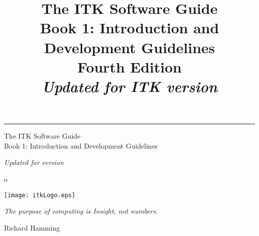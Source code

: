 \documentclass{InsightSoftwareGuide}
\title{The ITK Software Guide\\Book 1: Introduction and Development Guidelines\\Fourth Edition\\ \emph{Updated for ITK version
\ITKVERSIONMAJORMINOR}}
\begin{document}
\ifitkPrintedVersion

  \begin{minipage}[t][3cm][b]{\textwidth}
  \rule{14cm}{1pt}
  \end{minipage}

  \begin{minipage}[t][3cm][b]{\textwidth}
  \Huge
  The ITK Software Guide\\
  Book 1: Introduction and Development Guidelines\\
  \normalsize
  \par
  \emph{Updated for version \ITKVERSIONMAJORMINOR}\\

  \end{minipage}

  
  

\fi

\maketitle

\frontmatter



%
o
%
\cleardoublepage

\begin{minipage}[t][10cm][b]{\textwidth}
\center
\texttt{[image: itkLogo.eps]}
\large
\begin{center}
\emph{The purpose of computing is Insight, not numbers.}\\
\end{center}
\hspace{8cm} Richard Hamming
\normalsize
\end{minipage}



%
\pagestyle{plain}
%


\ifitkPrintedVersion
  
\fi

\ifitkFullVersion
  
  
  
\fi



%
%
\end{document}
